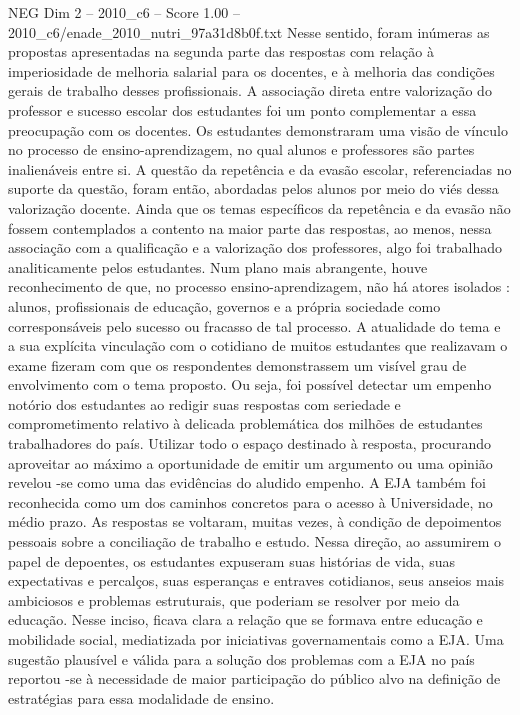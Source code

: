 \begin{textsample}{NEG Dim 2 – 2010\_c6 – Score 1.00 – 2010\_c6/enade\_2010\_nutri\_97a31d8b0f.txt}
Nesse sentido, foram inúmeras as propostas apresentadas na segunda parte das respostas com relação à imperiosidade de melhoria salarial para os docentes, e à melhoria das condições gerais de trabalho desses profissionais.
A associação direta entre valorização do professor e sucesso escolar dos estudantes foi um ponto complementar a essa preocupação com os docentes.
Os estudantes demonstraram uma visão de vínculo no processo de ensino-aprendizagem, no qual alunos e professores são partes inalienáveis entre si.
A questão da repetência e da evasão escolar, referenciadas no suporte da questão, foram então, abordadas pelos alunos por meio do viés dessa valorização docente.
Ainda que os temas específicos da repetência e da evasão não fossem contemplados a contento na maior parte das respostas, ao menos, nessa associação com a qualificação e a valorização dos professores, algo foi trabalhado analiticamente pelos estudantes.
Num plano mais abrangente, houve reconhecimento de que, no processo ensino-aprendizagem, não há atores isolados : alunos, profissionais de educação, governos e a própria sociedade como corresponsáveis pelo sucesso ou fracasso de tal processo.
A atualidade do tema e a sua explícita vinculação com o cotidiano de muitos estudantes que realizavam o exame fizeram com que os respondentes demonstrassem um visível grau de envolvimento com o tema proposto.
Ou seja, foi possível detectar um empenho notório dos estudantes ao redigir suas respostas com seriedade e comprometimento relativo à delicada problemática dos milhões de estudantes trabalhadores do país.
Utilizar todo o espaço destinado à resposta, procurando aproveitar ao máximo a oportunidade de emitir um argumento ou uma opinião revelou -se como uma das evidências do aludido empenho.
A EJA também foi reconhecida como um dos caminhos concretos para o acesso à Universidade, no médio prazo.
As respostas se voltaram, muitas vezes, à condição de depoimentos pessoais sobre a conciliação de trabalho e estudo.
Nessa direção, ao assumirem o papel de depoentes, os estudantes expuseram suas histórias de vida, suas expectativas e percalços, suas esperanças e entraves cotidianos, seus anseios mais ambiciosos e problemas estruturais, que poderiam se resolver por meio da educação.
Nesse inciso, ficava clara a relação que se formava entre educação e mobilidade social, mediatizada por iniciativas governamentais como a EJA.
Uma sugestão plausível e válida para a solução dos problemas com a EJA no país reportou -se à necessidade de maior participação do público alvo na definição de estratégias para essa modalidade de ensino.

\end{textsample}
